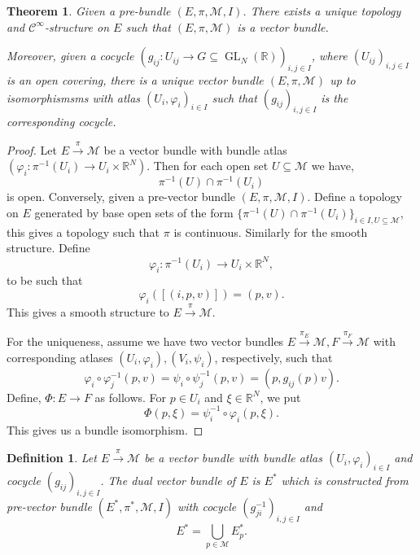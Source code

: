 \documentclass[8pt]{article}
\newtheorem{theorem}{Theorem} [section]
\newtheorem{definition}{Definition}[section]
\DeclareMathOperator{\GL}{GL}
\newcommand{\R}[0]{\mathbb{R}}
\newcommand{\M}[0]{\mathcal{M}}
\newcommand{\cinf}[0]{\mathcal{C}^\infty}
\begin{document}
\begin{theorem}
  Given a pre-bundle $(E,\pi,\M,I)$. There exists a unique topology and $\cinf$-structure on $E$ such that $(E,\pi,\M)$ is a vector bundle.
  \par Moreover, given a cocycle $(g_{ij}:U_{ij}\to G\subseteq\GL_N(\R))_{i,j\in I}$, where $(U_{ij})_{i,j\in I}$ is an open covering, there is a unique vector bundle $(E,\pi,\M)$ up to isomorphismsms with atlas $(U_i,\varphi_i)_{i\in I}$ such that $(g_{ij})_{i,j\in I}$ is the corresponding cocycle.
\end{theorem}

\begin{proof}
  Let $E\stackrel{\pi}{\to}\M$ be a vector bundle with bundle atlas $(\varphi_i:\pi^{-1}(U_i)\to U_i\times \R^N)$. Then for each open set $U\subseteq\M$ we have,
  \begin{equation*}
    \pi^{-1}(U)\cap\pi^{-1}(U_i)
  \end{equation*}
  is open. Conversely, given a pre-vector bundle $(E,\pi,\M,I)$. Define a topology on $E$ generated by base open sets of the form $\{\pi^{-1}(U)\cap\pi^{-1}(U_i)\}_{i\in I,U\subseteq\M}$, this gives a topology such that $\pi$ is continuous. Similarly for the smooth structure. Define 
  \begin{equation*}
    \varphi_i:\pi^{-1}(U_i)\to U_i\times \R^N,
  \end{equation*}
  to be such that 
  \begin{equation*}
    \varphi_i([(i,p,v)]) = (p,v).
  \end{equation*}
  This gives a smooth structure to $E\stackrel{\pi}{\to}\M$.
  \par For the uniqueness, assume we have two vector bundles $E\stackrel{\pi_E}{\to}\M,F\stackrel{\pi_F}{\to}\M$ with corresponding atlases $(U_i,\varphi_i),(V_i,\psi_i)$, respectively, such that 
  \begin{equation*}
    \varphi_i\circ\varphi_j^{-1}(p,v) = \psi_i\circ\psi_{j}^{-1}(p,v) = (p,g_{ij}(p)v).
  \end{equation*}
  Define, $\Phi:E\to F$ as follows. For $p\in U_i$ and $\xi\in\R^N$, we put
  \begin{equation*}
    \Phi(p,\xi) = \psi_i^{-1}\circ\varphi_i(p,\xi).
  \end{equation*}
  This gives us a bundle isomorphism.
\end{proof}

\begin{definition}
  Let $E\stackrel{\pi}{\to}\M$ be a vector bundle with bundle atlas $(U_i,\varphi_i)_{i\in I}$ and cocycle $(g_{ij})_{i,j\in I}$. The dual vector bundle of $E$ is $E^*$ which is constructed from pre-vector bundle $(E^*,\pi^*,\M,I)$ with cocycle $(g_{ji}^{-1})_{i,j\in I}$ and  
  \begin{equation*}
    E^* = \bigcup_{p\in \M}E_p^*.
  \end{equation*}
\end{definition}
\end{document}
